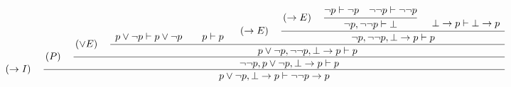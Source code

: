 \documentclass{standalone}
\begin{document}
$
\left(\rightarrow{}I\right)\quad
\cfrac{
  \left(P\right)\quad
  \cfrac{
    \left(\lor{}E\right)\quad
    \cfrac{
      \begin{array}{c}\\p\lor\lnot{}p\vdash{}p\lor\lnot{}p\end{array}
      \quad
      \begin{array}{c}\\p\vdash{}p\end{array}
      \quad
      \left(\rightarrow{}E\right)\quad
      \cfrac{
        \left(\rightarrow{}E\right)\quad
        \cfrac{
          \lnot{}p\vdash\lnot{}p\quad\lnot\lnot{}p\vdash\lnot\lnot{}p
        }{
          \lnot{}p,\lnot\lnot{}p\vdash{}\bot
        }
        \quad
        \begin{array}{c}\\\bot\rightarrow{}p\vdash\bot\rightarrow{}p\end{array}
      }{
        \lnot{}p,\lnot\lnot{}p,\bot\rightarrow{}p\vdash{}p
      }
    }{
      p\lor\lnot{}p,\lnot\lnot{}p,\bot\rightarrow{}p\vdash{}p
    }
  }{
    \lnot\lnot{}p,p\lor\lnot{}p,\bot\rightarrow{}p\vdash{}p
  }
}{
  p\lor\lnot{}p,\bot\rightarrow{}p\vdash\lnot\lnot{}p\rightarrow{}p
}
$
\end{document}
